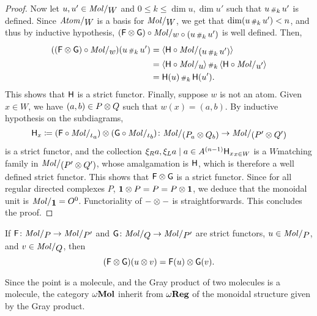 \begin{proof}
    Now let \( u, u' \in \molecin{W} \) and \( 0 \le k \le \dim u, \dim u' \) such that \( u \,{\scriptstyle\#}_{k}\, u' \) is defined.
    Since \( \atomin{W} \) is a basis for \( \molecin{W} \), we get that \( \dim (u \,{\scriptstyle\#}_{k}\, u') < n \), and thus by inductive hypothesis, 
    \( (\F \gray \G)  \after \molecin{w \after (u \cp{k} u')} \) is well defined.
    Then,
    \begin{align*}
        ((\F \gray \G)  \after \molecin{w})(u \cp{k} u') &= \pcell{\fun{H} \after \molecin{(u \cp{k} u')}} \\
                                                         &= \pcell{\fun{H} \after \molecin{u}} \cp{k} \pcell{\fun{H} \after \molecin{u'}} \\
                                                         &= \fun{H}(u) \cp{k} \fun{H}(u').
    \end{align*}
    This shows that \( \mathsf{H} \) is a strict functor.
    Finally, suppose \( w \) is not an atom.
    Given \( x \in W \), we have \( (a, b) \in P \otimes Q \) such that \( w(x) = (a, b) \).
    By inductive hypothesis on the subdiagrams, 
    \begin{equation*}
        \fun{H}_x \eqdef (\F \after \molecin{\mapel{a}}) \gray (\G \after \molecin{\mapel{b}}) \colon \molecin{(\imel{P}{a} \gray \imel{Q}{b})} \to \molecin{(P' \gray Q')}
    \end{equation*}
    is a strict functor, and the collection \( \set{\fun{H}_x}_{x \in W} \) is a \( W \)\nbd matching family in \( \molecin{(P' \gray Q')} \), whose amalgamation is \( \mathsf{H} \), which is therefore a well defined strict functor.
    This shows that \( \mathsf{F} \otimes \mathsf{G} \) is a strict functor.
    Since for all regular directed complexes \( P \), \( \mathbf{1} \otimes P = P = P \otimes \mathbf{1} \), we deduce that the monoidal unit is \( \molecin{\pt} = \globe{0} \).
    Functoriality of \( - \otimes - \) is straightforwards.
    This concludes the proof.
\end{proof}

\begin{rmk}
    If \( \F \colon \molecin{P} \to \molecin{P'} \) and \( \G \colon \molecin{Q} \to \molecin{P'} \) are strict functors, \( u \in \molecin{P} \), and \( v \in \molecin{Q} \), then 
    \begin{equation*}
       (\mathsf{F} \otimes \mathsf{G})(u \otimes v) = \mathsf{F}(u) \otimes \mathsf{G}(v). 
    \end{equation*}
\end{rmk}

\begin{rmk}
    Since the point is a molecule, and the Gray product of two molecules is a molecule, the category \( \omega\mathbf{Mol} \) inherit from \( \omega\mathbf{Reg} \) of the monoidal structure given by the Gray product. 
\end{rmk}

